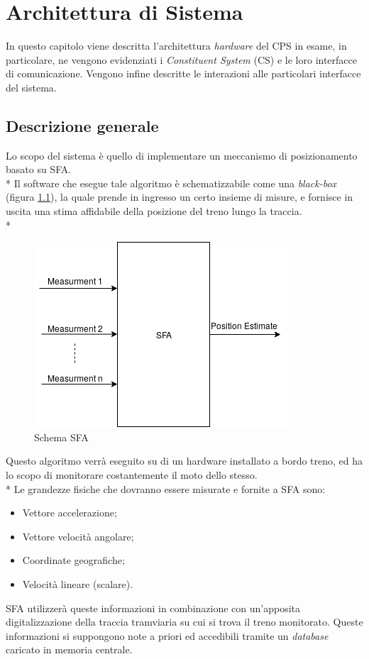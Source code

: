 \chapter{Architettura di Sistema}
In questo capitolo viene descritta l'architettura \emph{hardware} del CPS in esame, in particolare, ne vengono evidenziati i \emph{Constituent System} (CS) e le loro interfacce di comunicazione. Vengono infine descritte le interazioni alle particolari interfacce del sistema.
\section{Descrizione generale}
Lo scopo del sistema \`e quello di implementare un meccanismo di posizionamento basato su SFA.\\*
Il software che esegue tale algoritmo \`e schematizzabile come una \emph{black-box} (figura \ref{fig:sfa}), la quale prende in ingresso un certo insieme di misure, e fornisce in uscita una stima affidabile della posizione del treno lungo la traccia.\\*
\begin{figure}[h]
	\centering
	\includegraphics[scale=0.75]{img/sfaschema}
	\caption{Schema SFA}
	\label{fig:sfa}
\end{figure}
\clearpage
Questo algoritmo verr\`a eseguito su di un hardware installato a bordo treno, ed ha lo scopo di monitorare costantemente il moto dello stesso.\\*
Le grandezze fisiche che dovranno essere misurate e fornite a SFA sono:
\begin{itemize}
	\item Vettore accelerazione;
	\item Vettore velocit\`a angolare;
	\item Coordinate geografiche;
	\item Velocit\`a lineare (scalare).
\end{itemize}
SFA utilizzer\`a queste informazioni in combinazione con un'apposita digitalizzazione della traccia tramviaria su cui si trova il treno monitorato. Queste informazioni si suppongono note a priori ed accedibili tramite un \emph{database} caricato in memoria centrale.
